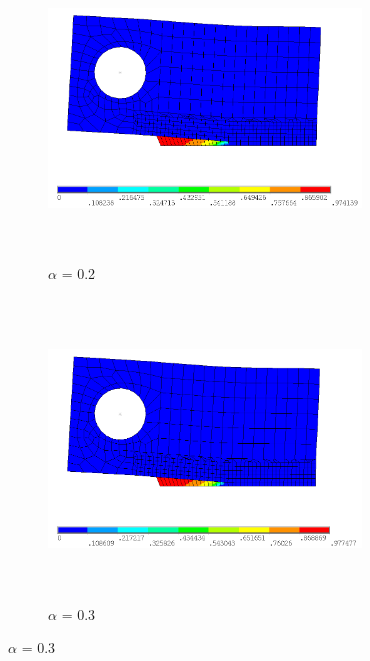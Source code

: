 \documentclass[a4paper,12pt,twoside]{report}
\begin{document}
\FloatBarrier
\begin{figure}[htbp!]
       \captionsetup[subfigure]{justification=centering}
     \begin{subfigure}{0.4\textwidth}
        \centering
         \includegraphics[width=8.3cm,height=8cm,keepaspectratio]{26.d2_a_0.2.png}
         \centering
         \caption{$\alpha$ = 0.2}
         \label{fig:d2-a_0.2}
     \end{subfigure}
    \hspace{1.8cm}
     \captionsetup[subfigure]{justification=centering}
     \begin{subfigure}{0.4\textwidth}
         \centering
         \includegraphics[width=8.3cm,height=8cm,keepaspectratio]{26.d2_a_0.3.png}
         \centering
         \caption{$\alpha$ = 0.3}
         \label{fig:d2-a_0.3}
     \end{subfigure}
\end{figure}
\FloatBarrier
\end{document}
